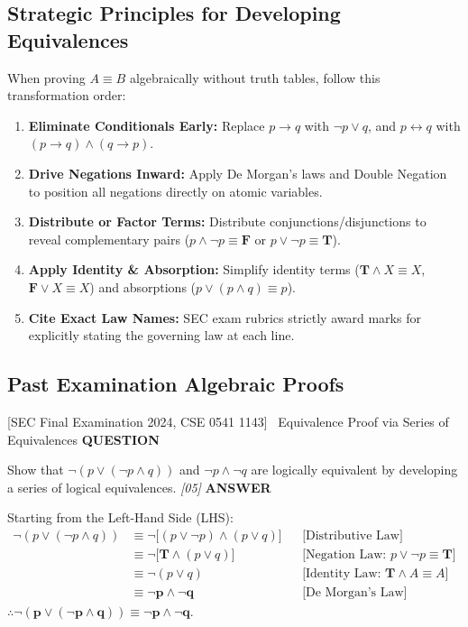 \documentclass[11pt,a4paper]{article}
\newcommand{\Qlabel}{\textbf{\color{navy}\footnotesize\MakeUppercase{Question}}\par\smallskip}
\newcommand{\Alabel}{\textbf{\color{teal}\footnotesize\MakeUppercase{Answer}}\par\smallskip}
\begin{document}
\newpage

\subsection{Strategic Principles for Developing Equivalences}
\begin{notebox}
When proving $A \equiv B$ algebraically without truth tables, follow this transformation order:
\begin{enumerate}[leftmargin=1.4em,itemsep=1.5pt]
    \item \textbf{Eliminate Conditionals Early:} Replace $p \to q$ with $\neg p \vee q$, and $p \leftrightarrow q$ with $(p \to q) \wedge (q \to p)$.
    \item \textbf{Drive Negations Inward:} Apply De Morgan's laws and Double Negation to position all negations directly on atomic variables.
    \item \textbf{Distribute or Factor Terms:} Distribute conjunctions/disjunctions to reveal complementary pairs ($p \wedge \neg p \equiv \mathbf{F}$ or $p \vee \neg p \equiv \mathbf{T}$).
    \item \textbf{Apply Identity \& Absorption:} Simplify identity terms ($\mathbf{T} \wedge X \equiv X$, $\mathbf{F} \vee X \equiv X$) and absorptions ($p \vee (p \wedge q) \equiv p$).
    \item \textbf{Cite Exact Law Names:} SEC exam rubrics strictly award marks for explicitly stating the governing law at each line.
\end{enumerate}
\end{notebox}

\subsection{Past Examination Algebraic Proofs}

\begin{exambox}{[SEC Final Examination 2024, CSE 0541 1143] \ Equivalence Proof via Series of Equivalences}
\Qlabel
Show that $\neg(p \vee (\neg p \wedge q))$ and $\neg p \wedge \neg q$ are logically equivalent by developing a series of logical equivalences. \hfill\textit{[05]}
\tcblower
\Alabel
Starting from the Left-Hand Side (LHS):
\begin{align*}
\neg(p \vee (\neg p \wedge q)) &\equiv \neg\big[(p \vee \neg p) \wedge (p \vee q)\big] && \text{[Distributive Law]} \\
&\equiv \neg\big[\mathbf{T} \wedge (p \vee q)\big] && \text{[Negation Law: } p \vee \neg p \equiv \mathbf{T}\text{]} \\
&\equiv \neg(p \vee q) && \text{[Identity Law: } \mathbf{T} \wedge A \equiv A\text{]} \\
&\equiv \mathbf{\neg p \wedge \neg q} && \text{[De Morgan's Law]}
\end{align*}
$\therefore \mathbf{\neg(p \vee (\neg p \wedge q)) \equiv \neg p \wedge \neg q}$. \quad [Q.E.D.]
\end{exambox}
\end{document}
